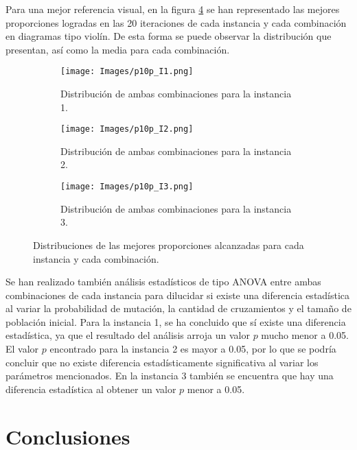 \documentclass{article}
\begin{document}
\newpage

Para una mejor referencia visual, en la figura \ref{fig4} se han representado las mejores proporciones logradas en las 20 iteraciones de cada instancia y cada combinaci\'on en diagramas tipo viol\'in. De esta forma se puede observar la distribuci\'on que presentan, as\'i como la media para cada combinaci\'on.\\

\begin{figure}
\centering
    \begin{subfigure}[b]{0.49\textwidth}
         \centering
         \texttt{[image: Images/p10p\_I1.png]}
         \caption{Distribuci\'on de ambas combinaciones para la instancia 1.}
         \label{fig4a}
    \end{subfigure}
    \begin{subfigure}[b]{0.49\textwidth}
         \centering
         \texttt{[image: Images/p10p\_I2.png]}
         \caption{Distribuci\'on de ambas combinaciones para la instancia 2.}
         \label{fig4b}
    \end{subfigure}
    \begin{subfigure}[b]{0.49\textwidth}
         \centering
         \texttt{[image: Images/p10p\_I3.png]}
         \caption{Distribuci\'on de ambas combinaciones para la instancia 3.}
         \label{fig4c}
    \end{subfigure}
    \caption{Distribuciones de las mejores proporciones alcanzadas para cada instancia y cada combinaci\'on.}
    \label{fig4}
\end{figure}

Se han realizado tambi\'en an\'alisis estad\'isticos de tipo ANOVA entre ambas combinaciones de cada instancia para dilucidar si existe una diferencia estad\'istica al variar la probabilidad de mutaci\'on, la cantidad de cruzamientos y el tama\~no de poblaci\'on inicial. Para la instancia 1, se ha concluido que s\'i existe una diferencia estad\'istica, ya que el resultado del an\'alisis arroja un valor $p$ mucho menor a 0.05. El valor $p$ encontrado para la instancia 2 es mayor a 0.05, por lo que se podr\'ia concluir que no existe diferencia estad\'isticamente significativa al variar los par\'ametros mencionados. En la instancia 3 tambi\'en se encuentra que hay una diferencia estad\'istica al obtener un valor $p$ menor a 0.05.

\section{Conclusiones}
\end{document}
